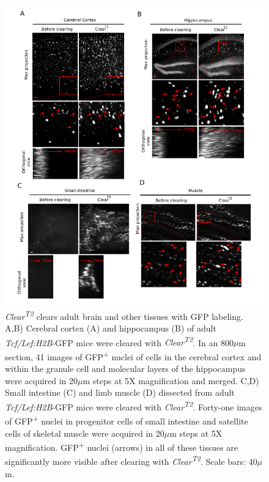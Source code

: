\begin{figure}[hbtp]
    \begin{center}
        \includegraphics{Figures/ClearT_Sfig4}
        \caption[\emph{Clear\textsuperscript{T2}} clears adult brain and other tissues with GFP labeling.]
        {\emph{Clear\textsuperscript{T2}} clears adult brain and other tissues with GFP labeling.
		A,B) Cerebral cortex (A) and hippocampus (B) of adult \emph{Tcf/Lef:H2B}-GFP mice were cleared with \emph{Clear\textsuperscript{T2}}.
		In an 800$\mu$m section, 41 images of GFP\textsuperscript{+} nuclei of cells in the cerebral cortex and within the granule cell and molecular layers of the hippocampus were acquired in 20$\mu$m steps at 5X magnification and merged.
		C,D) Small intestine (C) and limb muscle (D) dissected from adult \emph{Tcf/Lef:H2B}-GFP mice were cleared with \emph{Clear\textsuperscript{T2}}.
		Forty-one images of GFP\textsuperscript{+} nuclei in progenitor cells of small intestine and satellite cells of skeletal muscle were acquired in 20$\mu$m steps at 5X magnification.
		GFP\textsuperscript{+} nuclei (arrows) in all of these tissues are significantly more visible after clearing with \emph{Clear\textsuperscript{T2}}.
		Scale bars: 40$\mu$m.
		}
        \label{ClearT_Sfig4}
    \end{center}
\end{figure}

